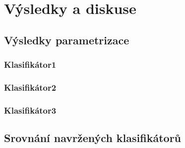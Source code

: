 \chapter{Výsledky a diskuse}
\section{Výsledky parametrizace}
\subsection{Klasifikátor1}
\subsection{Klasifikátor2}
\subsection{Klasifikátor3}
\section{Srovnání navržených klasifikátorů}